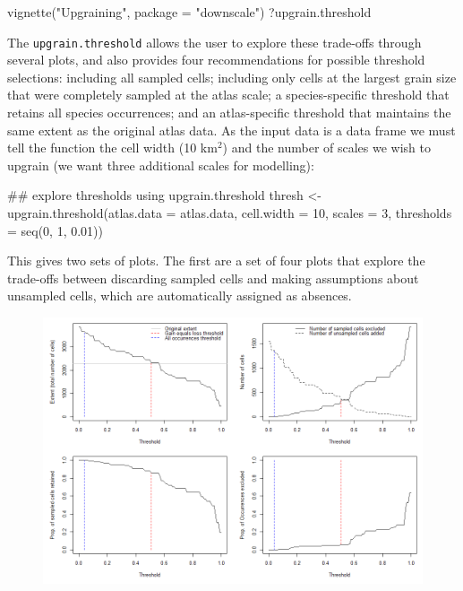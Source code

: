 \documentclass{article}[12pt, a4paper]
\begin{document}
\begin{Schunk}
\begin{Sinput}
vignette("Upgraining", package = "downscale")
?upgrain.threshold
\end{Sinput}
\end{Schunk}

The \texttt{upgrain.threshold} allows the user to explore these trade-offs through several plots, and also provides four recommendations for possible threshold selections: including all sampled cells; including only cells at the largest grain size that were completely sampled at the atlas scale; a species-specific threshold that retains all species occurrences; and an atlas-specific threshold that maintains the same extent as the original atlas data. As the input data is a data frame we must tell the function the cell width (10 km$^2$) and the number of scales we wish to upgrain (we want three additional scales for modelling):

\begin{Schunk}
\begin{Sinput}
## explore thresholds using upgrain.threshold
thresh <- upgrain.threshold(atlas.data = atlas.data,
                            cell.width = 10,
                            scales = 3,
                            thresholds = seq(0, 1, 0.01))
\end{Sinput}
\end{Schunk}

This gives two sets of plots. The first are a set of four plots that explore the trade-offs between discarding sampled cells and making assumptions about unsampled cells, which are automatically assigned as absences.

\newpage
\begin{figure}[!h]
\centering
\includegraphics[width=12.5cm]{Threshold_plots.png}
\end{figure}
\end{document}
